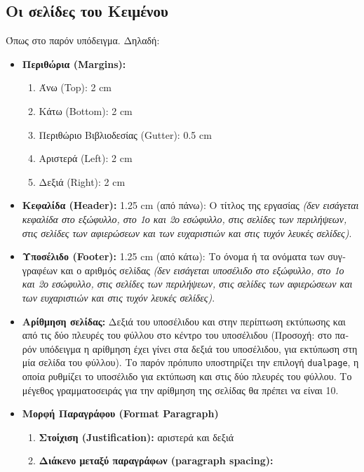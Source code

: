 \documentclass[inscr,ack,preface]{dithesis}
\begin{document}
\begin{greek}
    \subsection{Οι σελίδες του Κειμένου}
    Όπως στο παρόν υπόδειγμα. Δηλαδή:
    \begin{itemize}
      \item \textbf{Περιθώρια (Margins):}
      \begin{enumerate}[$\circ$]
        \item Άνω (Top): 2 cm
        \item Κάτω (Bottom): 2 cm
        \item Περιθώριο Βιβλιοδεσίας (Gutter): 0.5 cm
        \item Αριστερά (Left): 2 cm
        \item Δεξιά (Right): 2 cm
      \end{enumerate}
      \item \textbf{Κεφαλίδα (Header):} 1.25 cm (από πάνω): Ο τίτλος της εργασίας \emph{(δεν εισάγεται κεφαλίδα στο εξώφυλλο, στο 1ο και 2ο εσώφυλλο, στις σελίδες των περιλήψεων, στις σελίδες των αφιερώσεων και των ευχαριστιών και στις τυχόν λευκές σελίδες)}.
      \item \textbf{Υποσέλιδο (Footer):} 1.25 cm (από κάτω): Το όνομα ή τα ονόματα των συγγραφέων και ο αριθμός σελίδας \emph{(δεν εισάγεται υποσέλιδο στο εξώφυλλο, στο 1ο και 2ο εσώφυλλο, στις σελίδες των περιλήψεων, στις σελίδες των αφιερώσεων και των ευχαριστιών και στις τυχόν λευκές σελίδες)}.
      \item \textbf{Αρίθμηση σελίδας:} Δεξιά του υποσέλιδου και στην περίπτωση εκτύπωσης και από τις δύο πλευρές του φύλλου στο κέντρο του υποσέλιδου (Προσοχή: στο παρόν υπόδειγμα η αρίθμηση έχει γίνει στα δεξιά του υποσέλιδου, για εκτύπωση στη μία σελίδα του φύλλου). Το παρόν πρόπυπο υποστηρίζει την επιλογή \texttt{dualpage}, η οποία ρυθμίζει το υποσέλιδο για εκτύπωση και στις δύο πλευρές του φύλλου. Το μέγεθος γραμματοσειράς για την αρίθμηση της σελίδας θα πρέπει να είναι 10.
      \item \textbf{Μορφή Παραγράφου (Format Paragraph)}
      \begin{enumerate}[$\circ$]
        \item \textbf{Στοίχιση (Justification):} αριστερά και δεξιά
        \item \textbf{Διάκενο μεταξύ παραγράφων (paragraph spacing):}


\end{enumerate}
\end{itemize}
\end{greek}
\end{document}
